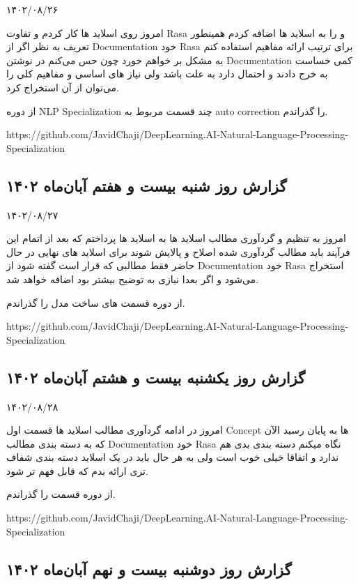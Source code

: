 ۱۴۰۲/۰۸/۲۶

امروز روی اسلاید ها کار کردم و تفاوت Rasa و  را به اسلاید ها اضافه کردم همینطور تعریف  
به نظر اگر از Documentation خود Rasa برای ترتیب ارائه مفاهیم استفاده کنم به مشکل بر خواهم خورد چون حس می‌کنم در نوشتن Documentation کمی خساست به خرج دادند و احتمال دارد به علت  باشد ولی نیاز های اساسی و مفاهیم کلی را می‌توان از آن استخراج کرد.

از دوره NLP Specialization چند قسمت مربوط به auto correction را گذراندم.

https://github.com/JavidChaji/DeepLearning.AI-Natural-Language-Processing-Specialization


\subsection{گزارش روز شنبه بیست و هفتم آبان‌ماه ۱۴۰۲}

۱۴۰۲/۰۸/۲۷

امروز به تنظیم و گردآوری مطالب اسلاید ها به اسلاید ها پرداختم که بعد از اتمام این فرآیند باید مطالب گردآوری شده اصلاح و پالایش شوند برای اسلاید های نهایی در حال حاضر فقط مطالبی که قرار است گفته شود از Documentation خود Rasa استخراج می‌شود و اگر بعدا نیازی به توضیح بیشتر بود اضافه خواهد شد.

از دوره  قسمت های ساخت مدل را گذراندم.

https://github.com/JavidChaji/DeepLearning.AI-Natural-Language-Processing-Specialization


\subsection{گزارش روز یکشنبه بیست و هشتم آبان‌ماه ۱۴۰۲}

۱۴۰۲/۰۸/۲۸

امروز در ادامه گردآوری مطالب اسلاید ها قسمت اول Concept ها به پایان رسید الآن که به دسته بندی مطالب Documentation خود Rasa نگاه میکنم دسته بندی بدی هم ندارد و اتفاقا خیلی خوب است ولی به هر حال باید در یک اسلاید دسته بندی شفاف تری ارائه بدم که قابل فهم تر شود.

از دوره  قسمت  را گذراندم.

 https://github.com/JavidChaji/DeepLearning.AI-Natural-Language-Processing-Specialization


\subsection{گزارش روز دوشنبه بیست و نهم آبان‌ماه ۱۴۰۲}

